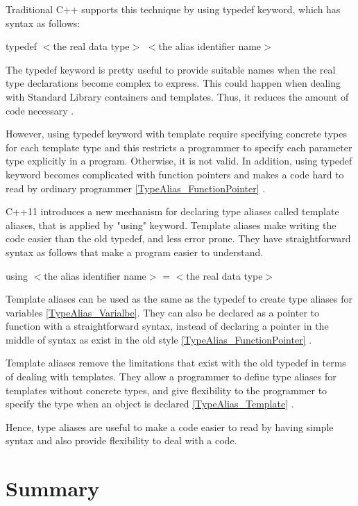 \documentclass[11pt]{report}
\begin{document}
Traditional C++ supports this technique by using typedef keyword, which has syntax as follows:
\begin{center}
 typedef $<$the real data type$>$ $<$the alias identifier name$>$
\end{center}

The typedef keyword is pretty useful to provide suitable names when the real type declarations become complex to express. This could happen when dealing with Standard Library containers and templates. Thus, it reduces the amount of code necessary \cite{Gregorie:professionalcpp}.


However, using typedef keyword with template require specifying concrete types for each template type and this restricts a programmer to specify each parameter type explicitly in a program. Otherwise, it is not valid. In addition, using typedef keyword becomes complicated with function pointers and makes a code hard to read by ordinary programmer \ref{TypeAlias_FunctionPointer} \cite{Gregorie:professionalcpp}.


C++11 introduces a new mechanism for declaring type aliases called template aliases, that is applied by "using" keyword.  Template aliases make writing the code easier than the old typedef, and less error prone. They have straightforward syntax as follows that make a program easier to understand.

\begin{center}
using $<$the alias identifier name$>$ = $<$the real data type$>$
\end{center}

Template aliases can be used as the same as the typedef to create type aliases for variables \ref{TypeAlias_Varialbe}. They can also be declared as a pointer to function with a straightforward syntax, instead of declaring a pointer in the middle of syntax as exist in the old style \ref{TypeAlias_FunctionPointer} \cite{Gregorie:professionalcpp}.


Template aliases remove the limitations that exist with the old typedef in terms of dealing with templates. They allow a programmer to define type aliases for templates without concrete types, and give flexibility to the programmer to specify the type when an object is declared \ref{TypeAlias_Template} \cite{Gregorie:professionalcpp}.


Hence, type aliases are useful to make a code easier to read by having simple syntax and also provide flexibility to deal with a code.

\section{Summary}
\label{sect: Summary}
\end{document}
